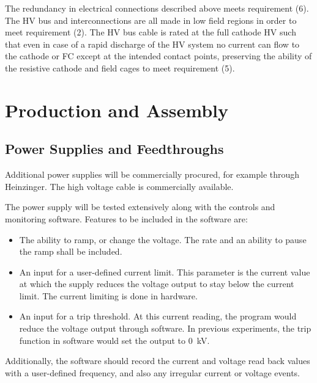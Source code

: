 The redundancy in electrical connections described above meets requirement (6).
The HV bus and interconnections are all made in low field regions in order to meet requirement (2).
The HV bus cable is rated at the full cathode HV such that even in case of a rapid discharge of the HV system no current can flow to the cathode or FC except at the intended contact points, preserving the ability of the resistive cathode and field cages to meet requirement (5).



\section{Production and Assembly}
\label{sec:fdsp-hv-prod-assy}

\subsection{Power Supplies and Feedthroughs}
\label{sec:fdsp-hv-supplies-feedthroughs}

Additional power supplies will be commercially procured, for example through Heinzinger. The high voltage cable is commercially available.

The power supply will be tested extensively along with the controls and monitoring software.  Features to be included in the software are:
\begin{itemize}
\item The ability to ramp, or change the voltage.  The rate and an ability to pause the ramp shall be included.
\item An input for a user-defined current limit.  This parameter is the current value at which the supply reduces the voltage output to stay below the current limit.  The current limiting is done in hardware.
\item An input for a trip threshold.  At this current reading, the program would reduce the voltage output through software.  In previous experiments, the trip function in software would set the output to \SI{0}{kV}.
\end{itemize}
\noindent Additionally, the software should record the current and voltage read back values with a user-defined frequency, and also any irregular current or voltage events.

